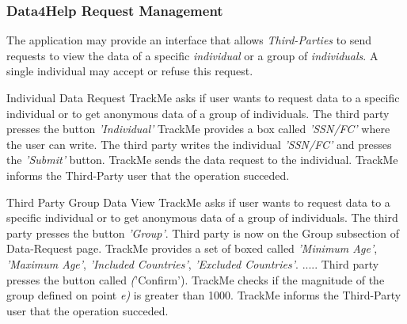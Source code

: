 \documentclass[a4paper]{article}
\begin{document}
        \subsubsection{Data4Help Request Management}
        The application may provide an interface that allows \textit{Third-Parties} to send requests to view the data of a specific \textit{individual} or a group of \textit{individuals}. A single individual may accept or refuse this request.
        
        \begin{usecase}{Individual Data Request}
              {TrackMe asks if user wants to request data to a specific individual or to get anonymous data of a group of individuals.}
              {The third party presses the button \textit{'Individual'} }
              {TrackMe provides a box called \textit{'SSN/FC'} where the user can write.}
              {The third party writes the individual \textit{'SSN/FC'} and presses the \textit{'Submit'} button.}
              {TrackMe sends the data request to the individual.}
              {TrackMe informs the Third-Party user that the operation succeded.}
        \end{usecase}
        
        \begin{usecase}{Third Party Group Data View}
              {TrackMe asks if user wants to request data to a specific individual or to get anonymous data of a group of individuals.}
              {The third party presses the button \textit{'Group'}. Third party is now on the Group subsection of Data-Request page.}
              {TrackMe provides a set of boxed called \textit{'Minimum Age'}, \textit{'Maximum Age'}, \textit{'Included Countries'}, \textit{'Excluded Countries'}.}
              {.....}
              {Third party presses the button called \textit('Confirm').}
              {TrackMe checks if the magnitude of the group defined on point \textit{e)} is greater than 1000.}
              {TrackMe informs the Third-Party user that the operation succeded.}
        \end{usecase}
        
\end{document}
